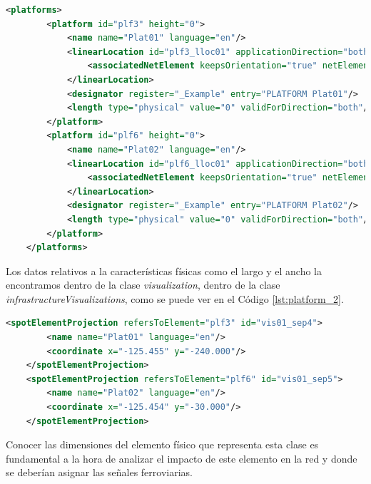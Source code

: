     \begin{lstlisting}[language = XML, caption = Clase \textit{Platform} , label = {lst:platform_1}]
    <platforms>
        <platform id="plf3" height="0">
            <name name="Plat01" language="en"/>
            <linearLocation id="plf3_lloc01" applicationDirection="both">
                <associatedNetElement keepsOrientation="true" netElementRef="ne1"/>
            </linearLocation>
            <designator register="_Example" entry="PLATFORM Plat01"/>
            <length type="physical" value="0" validForDirection="both"/>
        </platform>
        <platform id="plf6" height="0">
            <name name="Plat02" language="en"/>
            <linearLocation id="plf6_lloc01" applicationDirection="both">
                <associatedNetElement keepsOrientation="true" netElementRef="ne3"/>
            </linearLocation>
            <designator register="_Example" entry="PLATFORM Plat02"/>
            <length type="physical" value="0" validForDirection="both"/>
        </platform>
    </platforms>
    \end{lstlisting}

    Los datos relativos a la características físicas como el largo y el ancho la encontramos dentro de la clase \textit{visualization}, dentro de la clase \textit{infrastructureVisualizations}, como se puede ver en el Código \ref{lst:platform_2}.

    \begin{lstlisting}[language = XML, caption = Clase \textit{Visualization} , label = {lst:platform_2}]
    <spotElementProjection refersToElement="plf3" id="vis01_sep4">
        <name name="Plat01" language="en"/>
        <coordinate x="-125.455" y="-240.000"/>
    </spotElementProjection>
    <spotElementProjection refersToElement="plf6" id="vis01_sep5">
        <name name="Plat02" language="en"/>
        <coordinate x="-125.454" y="-30.000"/>
    </spotElementProjection>
    \end{lstlisting}

    Conocer las dimensiones del elemento físico que representa esta clase es fundamental a la hora de analizar el impacto de este elemento en la red y donde se deberían asignar las señales ferroviarias.